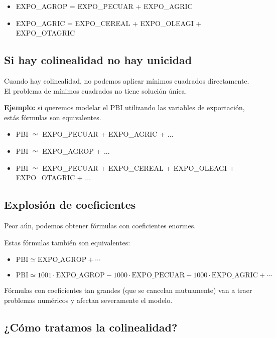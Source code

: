\documentclass[a4paper]{article}
\begin{document}
\begin{itemize}
\item EXPO\_AGROP = EXPO\_PECUAR + EXPO\_AGRIC 
\item EXPO\_AGRIC = EXPO\_CEREAL + EXPO\_OLEAGI + EXPO\_OTAGRIC
\end{itemize}

\subsection{Si hay colinealidad no hay unicidad}

Cuando hay colinealidad, no podemos aplicar mínimos cuadrados directamente.
El problema de mínimos cuadrados no tiene solución única.

\textbf{Ejemplo:} si queremos modelar el PBI utilizando las variables de exportación, estás fórmulas son equivalentes.

{\footnotesize
\begin{itemize}
\item PBI $\simeq$ EXPO\_PECUAR + EXPO\_AGRIC + ...
\item PBI $\simeq$ EXPO\_AGROP + ...
\item PBI $\simeq$ EXPO\_PECUAR + EXPO\_CEREAL + EXPO\_OLEAGI + EXPO\_OTAGRIC  + ...
\end{itemize}
}

\subsection{Explosión de coeficientes}

Peor aún, podemos obtener fórmulas con coeficientes enormes.

Estas fórmulas también son equivalentes:
{\small
\begin{itemize}
\item $\text{PBI} \simeq \text{EXPO\_AGROP} + \cdots$
\item $\text{PBI} \simeq 1001 \cdot \text{EXPO\_AGROP} - 1000 \cdot \text{EXPO\_PECUAR} - 1000 \cdot \text{EXPO\_AGRIC} + \cdots$
\end{itemize}
}

Fórmulas con coeficientes tan grandes (que se cancelan mutuamente) van a traer problemas numéricos  y afectan severamente el modelo.

\subsection{¿Cómo tratamos la colinealidad?}
\end{document}
